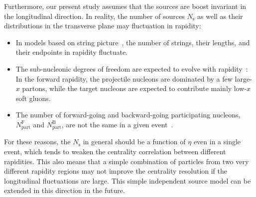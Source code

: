 Furthermore, our present study assumes that the sources are boost invariant in the longitudinal direction. In reality, the number of sources $N_\text{s}$ as well as their distributions in the transverse plane may fluctuation in rapidity:
\begin{itemize}
\item In models based on string picture~\cite{Bozek:2015bna, Pang:2015zrq, Shen:2017bsr}, the number of strings, their lengths, and their endpoints in rapidity fluctuate.
\item The sub-nucleonic degrees of freedom are expected to evolve with rapidity~\cite{Schenke:2016ksl}: In the forward rapidity, the projectile nucleons are dominated by a few large-$x$ partons, while the target nucleons are expected to contribute mainly low-$x$ soft gluons.
\item The number of forward-going and backward-going participating nucleons, $N_\text{part}^\text{F}$ and $N_\text{part}^\text{B}$, are not the same in a given event~\cite{Jia:2015jga, Jia:2014ysa}.
\end{itemize}
For these reasons, the $N_\text{s}$ in general should be a function of $\eta$ even in a single event, which tends to weaken the centrality correlation between different rapidities. This also means that a simple combination of particles from two very different rapidity regions may not improve the centrality resolution if the longitudinal fluctuations are large. This simple independent source model can be extended in this direction in the future.

